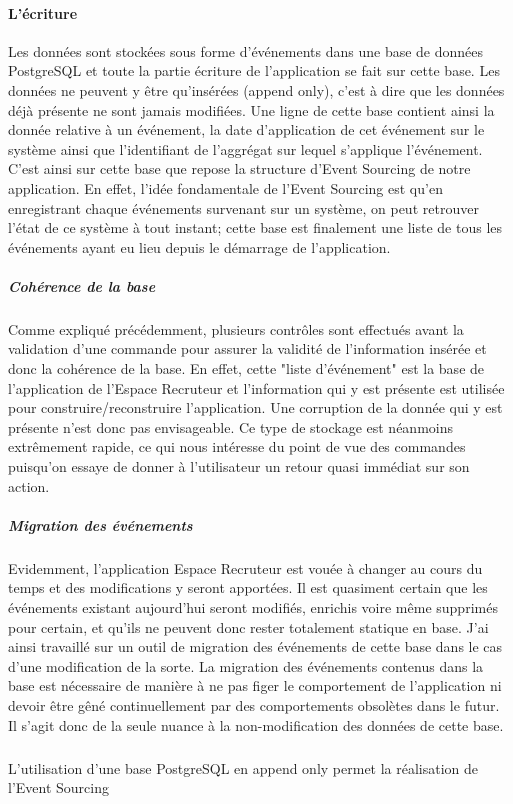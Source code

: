 \paragraph{L'écriture}
\label{par:L'écriture}
Les données sont stockées sous forme d'événements dans une base de données PostgreSQL et toute la partie écriture de l'application se fait sur cette base.
Les données ne peuvent y être qu'insérées (append only), c'est à dire que les données déjà présente ne sont jamais modifiées.
Une ligne de cette base contient ainsi la donnée relative à un événement, la date d'application de cet événement sur le système ainsi que l'identifiant de l'aggrégat sur lequel s'applique l'événement.
C'est ainsi sur cette base que repose la structure d'Event Sourcing de notre application.
En effet, l'idée fondamentale de l'Event Sourcing est qu'en enregistrant chaque événements survenant sur un système, on peut retrouver l'état de ce système à tout instant; cette base est finalement une liste de tous les événements ayant eu lieu depuis le démarrage de l'application.
\subparagraph{Cohérence de la base}
Comme expliqué précédemment, plusieurs contrôles sont effectués avant la validation d'une commande pour assurer la validité de l'information insérée et donc la cohérence de la base.
En effet, cette "liste d'événement" est la base de l'application de l'Espace Recruteur et l'information qui y est présente est utilisée pour construire/reconstruire l'application.
Une corruption de la donnée qui y est présente n'est donc pas envisageable.
Ce type de stockage est néanmoins extrêmement rapide, ce qui nous intéresse du point de vue des commandes puisqu'on essaye de donner à l'utilisateur un retour quasi immédiat sur son action.
\subparagraph{Migration des événements}
Evidemment, l'application Espace Recruteur est vouée à changer au cours du temps et des modifications y seront apportées.
Il est quasiment certain que les événements existant aujourd'hui seront modifiés, enrichis voire même supprimés pour certain, et qu'ils ne peuvent donc rester totalement statique en base.
J'ai ainsi travaillé sur un outil de migration des événements de cette base dans le cas d'une modification de la sorte.
La migration des événements contenus dans la base est nécessaire de manière à ne pas figer le comportement de l'application ni devoir être gêné continuellement par des comportements obsolètes dans le futur.
Il s'agit donc de la seule nuance à la non-modification des données de cette base.
\subparagraph{}
L'utilisation d'une base PostgreSQL en append only permet la réalisation de l'Event Sourcing

